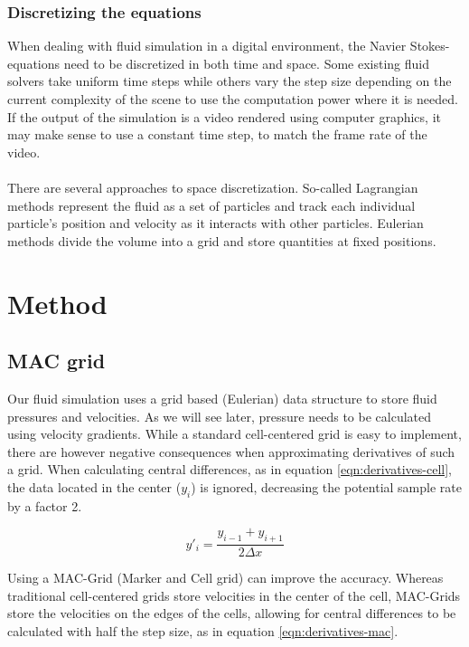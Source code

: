 \documentclass[twocolumn]{article}
\begin{document}
\subsubsection{Discretizing the equations}
When dealing with fluid simulation in a digital environment, the Navier Stokes-equations need to be discretized in both time and space. Some existing fluid solvers take uniform time steps while others vary the step size depending on the current complexity of the scene to use the computation power where it is needed. If the output of the simulation is a video rendered using computer graphics, it may make sense to use a constant time step, to match the frame rate of the video. 
\\\\
There are several approaches to space discretization. So-called Lagrangian methods represent the fluid as a set of particles and track each individual particle's position and velocity as it interacts with other particles. Eulerian methods divide the volume into a grid and store quantities at fixed positions.



\section{Method}
\label{sec:method}

\subsection{MAC grid}
\label{sec:mac}
Our fluid simulation uses a grid based (Eulerian) data structure to store fluid pressures and velocities. As we will see later, pressure needs to be calculated using velocity gradients. While a standard cell-centered grid is easy to implement, there are however negative consequences when approximating derivatives of such a grid. When calculating central differences, as in equation \ref{eqn:derivatives-cell}, the data located in the center ($y_i$) is ignored, decreasing the potential sample rate by a factor 2. 

\begin{equation}
y'_i = \frac{y_{i-1}+y_{i+1}}{2\Delta x}
\label{eqn:derivatives-cell}
\end{equation}

Using a MAC-Grid (Marker and Cell grid) can improve the accuracy. Whereas traditional cell-centered grids store velocities in the center of the cell, MAC-Grids store the velocities on the edges of the cells, allowing for central differences to be calculated with half the step size, as in equation \ref{eqn:derivatives-mac}.
\end{document}
